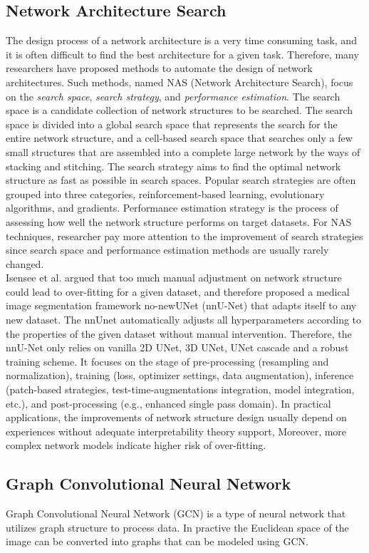 \subsection{Network Architecture Search}
The design process of a network architecture is a very time consuming task, and
it is often difficult to find the best architecture for a given task. Therefore,
many researchers have proposed methods to automate the design of network
architectures. Such methods, named NAS (Network Architecture Search), focus on
the \emph{search space}, \emph{search strategy}, and \emph{performance
estimation}.
The search space is a candidate collection of network structures to be searched.
The search space is divided into a global search space that represents the
search for the entire network structure, and a cell-based search space that
searches only a few small structures that are assembled into a complete large
network by the ways of stacking and stitching. The search strategy aims to find
the optimal network structure as fast as possible in search spaces. Popular
search strategies are often grouped into three categories, reinforcement-based
learning, evolutionary algorithms, and gradients. Performance estimation
strategy is the process of assessing how well the network structure performs on
target datasets. For NAS techniques, researcher pay more attention to the
improvement of search strategies since search space and performance estimation
methods are usually rarely changed.\\
Isensee et al. argued that too much manual adjustment on network structure could
lead to over-fitting for a given dataset, and therefore proposed a medical image
segmentation framework no-newUNet (nnU-Net) that adapts itself to any new
dataset. The nnUnet automatically adjusts all hyperparameters according to the
properties of the given dataset without manual intervention. Therefore, the
nnU-Net only relies on vanilla 2D UNet, 3D UNet, UNet cascade and a robust
training scheme. It focuses on the stage of pre-processing (resampling and
normalization), training (loss, optimizer settings, data augmentation),
inference (patch-based strategies, test-time-augmentations integration, model
integration, etc.), and post-processing (e.g., enhanced single pass domain). In
practical applications, the improvements of network structure design usually
depend on experiences without adequate interpretability theory support,
Moreover, more complex network models indicate higher risk of over-fitting.


\subsection{Graph Convolutional Neural Network}
Graph Convolutional Neural Network (GCN) is a type of neural network that
utilizes graph structure to process data. In practive the Euclidean space of the
image can be converted into graphs that can be modeled using GCN.

